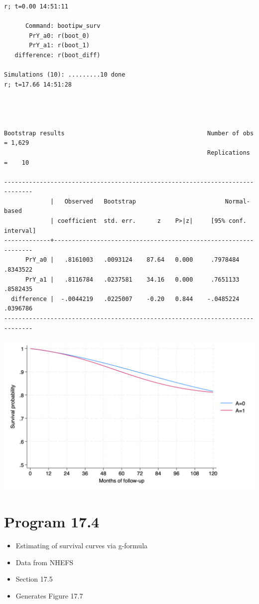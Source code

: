\documentclass[
  10pt,
  a4paper,
]{book}
\providecommand{\tightlist}{%
  \setlength{\itemsep}{0pt}\setlength{\parskip}{0pt}}
\begin{document}
\begin{verbatim}
r; t=0.00 14:51:11

      Command: bootipw_surv
       PrY_a0: r(boot_0)
       PrY_a1: r(boot_1)
   difference: r(boot_diff)

Simulations (10): .........10 done
r; t=17.66 14:51:28




Bootstrap results                                        Number of obs = 1,629
                                                         Replications  =    10

------------------------------------------------------------------------------
             |   Observed   Bootstrap                         Normal-based
             | coefficient  std. err.      z    P>|z|     [95% conf. interval]
-------------+----------------------------------------------------------------
      PrY_a0 |   .8161003   .0093124    87.64   0.000     .7978484    .8343522
      PrY_a1 |   .8116784   .0237581    34.16   0.000     .7651133    .8582435
  difference |  -.0044219   .0225007    -0.20   0.844    -.0485224    .0396786
------------------------------------------------------------------------------
\end{verbatim}

\begin{center}\includegraphics[width=0.85\linewidth]{./figs/stata-fig-17-3} \end{center}

\section{Program 17.4}\label{program-17.4-1}

\begin{itemize}
\tightlist
\item
  Estimating of survival curves via g-formula
\item
  Data from NHEFS
\item
  Section 17.5
\item
  Generates Figure 17.7
\end{itemize}
\end{document}
